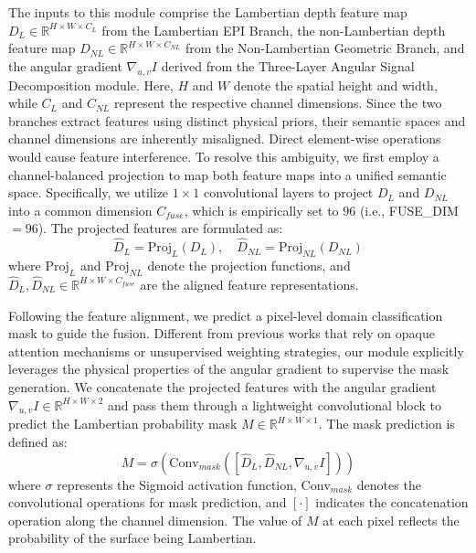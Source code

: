 The inputs to this module comprise the Lambertian depth feature map $D_L \in \mathbb{R}^{H \times W \times C_L}$ from the Lambertian EPI Branch, the non-Lambertian depth feature map $D_{NL} \in \mathbb{R}^{H \times W \times C_{NL}}$ from the Non-Lambertian Geometric Branch, and the angular gradient $\nabla_{u,v} I$ derived from the Three-Layer Angular Signal Decomposition module. Here, $H$ and $W$ denote the spatial height and width, while $C_L$ and $C_{NL}$ represent the respective channel dimensions. Since the two branches extract features using distinct physical priors, their semantic spaces and channel dimensions are inherently misaligned. Direct element-wise operations would cause feature interference. To resolve this ambiguity, we first employ a channel-balanced projection to map both feature maps into a unified semantic space. Specifically, we utilize $1 \times 1$ convolutional layers to project $D_L$ and $D_{NL}$ into a common dimension $C_{fuse}$, which is empirically set to $96$ (i.e., FUSE\_DIM $= 96$). The projected features are formulated as:
\begin{equation}
\label{eq:eq16}
\hat{D}_L = \text{Proj}_L(D_L), \quad \hat{D}_{NL} = \text{Proj}_{NL}(D_{NL})
\end{equation}
where $\text{Proj}_L$ and $\text{Proj}_{NL}$ denote the projection functions, and $\hat{D}_L, \hat{D}_{NL} \in \mathbb{R}^{H \times W \times C_{fuse}}$ are the aligned feature representations.

Following the feature alignment, we predict a pixel-level domain classification mask to guide the fusion. Different from previous works that rely on opaque attention mechanisms or unsupervised weighting strategies, our module explicitly leverages the physical properties of the angular gradient to supervise the mask generation. We concatenate the projected features with the angular gradient $\nabla_{u,v} I \in \mathbb{R}^{H \times W \times 2}$ and pass them through a lightweight convolutional block to predict the Lambertian probability mask $M \in \mathbb{R}^{H \times W \times 1}$. The mask prediction is defined as:
\begin{equation}
\label{eq:eq17}
M = \sigma \left( \text{Conv}_{mask} \left( [\hat{D}_L, \hat{D}_{NL}, \nabla_{u,v} I] \right) \right)
\end{equation}
where $\sigma$ represents the Sigmoid activation function, $\text{Conv}_{mask}$ denotes the convolutional operations for mask prediction, and $[\cdot]$ indicates the concatenation operation along the channel dimension. The value of $M$ at each pixel reflects the probability of the surface being Lambertian.

